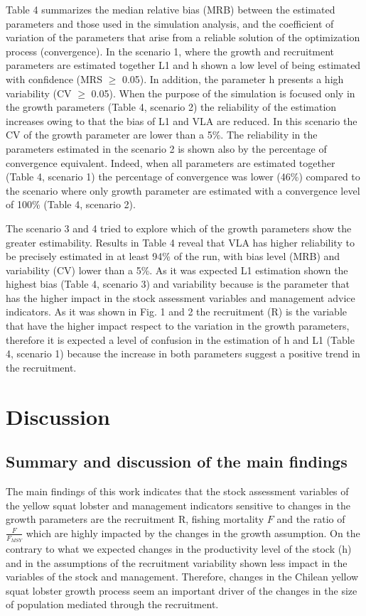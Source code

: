 \documentclass[11pt,letterpaper,]{article}
\begin{document}
Table 4 summarizes the median relative bias (MRB) between the estimated
parameters and those used in the simulation analysis, and the
coefficient of variation of the parameters that arise from a reliable
solution of the optimization process (convergence). In the scenario 1,
where the growth and recruitment parameters are estimated together L1
and h shown a low level of being estimated with confidence (MRS \(\geq\)
0.05). In addition, the parameter h presents a high variability (CV
\(\geq\) 0.05). When the purpose of the simulation is focused only in
the growth parameters (Table 4, scenario 2) the reliability of the
estimation increases owing to that the bias of L1 and VLA are reduced.
In this scenario the CV of the growth parameter are lower than a 5\%.
The reliability in the parameters estimated in the scenario 2 is shown
also by the percentage of convergence equivalent. Indeed, when all
parameters are estimated together (Table 4, scenario 1) the percentage
of convergence was lower (46\%) compared to the scenario where only
growth parameter are estimated with a convergence level of 100\% (Table
4, scenario 2).

The scenario 3 and 4 tried to explore which of the growth parameters
show the greater estimability. Results in Table 4 reveal that VLA has
higher reliability to be precisely estimated in at least 94\% of the
run, with bias level (MRB) and variability (CV) lower than a 5\%. As it
was expected L1 estimation shown the highest bias (Table 4, scenario 3)
and variability because is the parameter that has the higher impact in
the stock assessment variables and management advice indicators. As it
was shown in Fig. 1 and 2 the recruitment (R) is the variable that have
the higher impact respect to the variation in the growth parameters,
therefore it is expected a level of confusion in the estimation of h and
L1 (Table 4, scenario 1) because the increase in both parameters suggest
a positive trend in the recruitment.

\section{Discussion}\label{discussion}

\subsection{Summary and discussion of the main
findings}\label{summary-and-discussion-of-the-main-findings}

The main findings of this work indicates that the stock assessment
variables of the yellow squat lobster and management indicators
sensitive to changes in the growth parameters are the recruitment R,
fishing mortality \(F\) and the ratio of \(\frac{F}{F_{MSY}}\) which are
highly impacted by the changes in the growth assumption. On the contrary
to what we expected changes in the productivity level of the stock (h)
and in the assumptions of the recruitment variability shown less impact
in the variables of the stock and management. Therefore, changes in the
Chilean yellow squat lobster growth process seem an important driver of
the changes in the size of population mediated through the recruitment.
\end{document}
